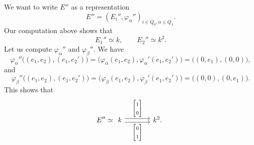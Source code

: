 \documentclass[11pt, a4paper]{report}
\begin{document}
\begin{example}
        We want to write \(E''\) as a representation
        \[
        E''=(E_i'',\varphi_\alpha'')_{i\in Q_0,\alpha\in Q_1}.
        \]
        Our computation above shows that
        \[
        E_1''\simeq k,
        \qquad
        E_2''\simeq k^2.
        \]
        Let us compute \(\varphi_\alpha''\) and \(\varphi_\beta''\). We have
        \[
        \varphi_\alpha''
        \bigl((e_1,e_2),(e_1,e_2')\bigr)
        =
        \bigl(
        \varphi_\alpha(e_1,e_2),
        \varphi_\alpha'(e_1,e_2')
        \bigr)
        =
        \bigl((0,e_1),(0,0)\bigr),
        \]
        and
        \[
        \varphi_\beta''
        \bigl((e_1,e_2),(e_1,e_2')\bigr)
        =
        \bigl(
        \varphi_\beta(e_1,e_2),
        \varphi_\beta'(e_1,e_2')
        \bigr)
        =
        \bigl((0,0),(0,e_1)\bigr).
        \]
        This shows that
        \[
        E''
        \simeq
        \begin{tikzcd}[column sep=large]
        k
        \arrow[r, shift left=0.6ex, "{\begin{bmatrix}1\\0\end{bmatrix}}"]
        \arrow[r, shift right=0.6ex, "{\begin{bmatrix}0\\1\end{bmatrix}}"']
        &
        k^2 .
        \end{tikzcd}
        \]


\end{example}
\end{document}
